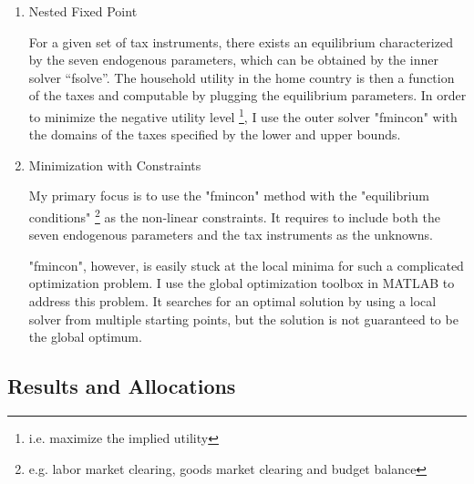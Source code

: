 \documentclass{homeworg}
\begin{document}
\begin{enumerate}[ref=Step \arabic{enumi}, wide=0pt]

\item Nested Fixed Point

For a given set of tax instruments, there exists an equilibrium characterized by the seven endogenous parameters, which can be obtained by the inner solver “fsolve”. The household utility in the home country is then a function of the taxes and computable by plugging the equilibrium parameters. In order to minimize the negative utility level \footnote{i.e. maximize the implied utility}, I use the outer solver "fmincon" with the domains of the taxes specified by the lower and upper bounds.

\item Minimization with Constraints

My primary focus is to use the "fmincon" method with the "equilibrium conditions" \footnote{e.g. labor market clearing, goods market clearing and budget balance} as the non-linear constraints. It requires to include both the seven endogenous parameters and the tax instruments as the unknowns.

"fmincon", however, is easily stuck at the local minima for such a complicated optimization problem. I use the global optimization toolbox in MATLAB to address this problem. It searches for an optimal solution by using a local solver from multiple starting points, but the solution is not guaranteed to be the global optimum.

\end{enumerate}

\subsection{Results and Allocations}
\end{document}
